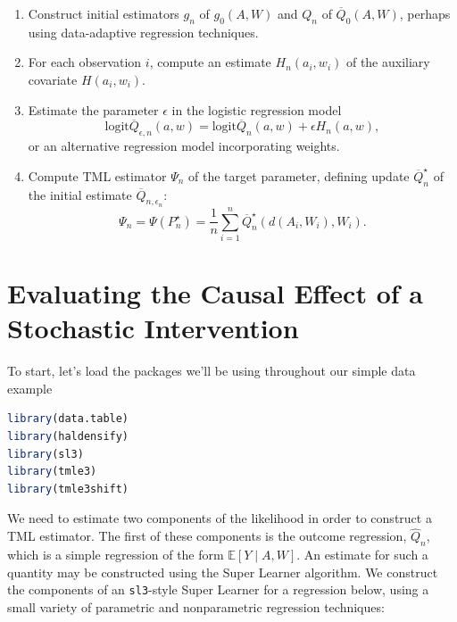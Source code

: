 \documentclass[12pt, krantz2,]{krantz}
\newcommand{\passthrough}[1]{#1}
\providecommand{\tightlist}{%
  \setlength{\itemsep}{0pt}\setlength{\parskip}{0pt}}
\theoremstyle{definition}
\theoremstyle{definition}
\theoremstyle{definition}
\newcommand{\E}{\mathbb{E}}
\newcommand{\1}{\mathbbm{1}}
\begin{document}
\begin{enumerate}
\def\labelenumi{\arabic{enumi}.}
\tightlist
\item
  Construct initial estimators \(g_n\) of \(g_0(A, W)\) and \(Q_n\) of
  \(\overline{Q}_0(A, W)\), perhaps using data-adaptive regression techniques.
\item
  For each observation \(i\), compute an estimate \(H_n(a_i, w_i)\) of the
  auxiliary covariate \(H(a_i,w_i)\).
\item
  Estimate the parameter \(\epsilon\) in the logistic regression model
  \[ \text{logit}\overline{Q}_{\epsilon, n}(a, w) =
  \text{logit}\overline{Q}_n(a, w) + \epsilon H_n(a, w),\]
  or an alternative regression model incorporating weights.
\item
  Compute TML estimator \(\Psi_n\) of the target parameter, defining update
  \(\overline{Q}_n^{\star}\) of the initial estimate
  \(\overline{Q}_{n, \epsilon_n}\):
  \begin{equation}
    \Psi_n = \Psi(P_n^{\star}) = \frac{1}{n} \sum_{i = 1}^n
    \overline{Q}_n^{\star}(d(A_i, W_i), W_i).
    \label{eq:tmle}
  \end{equation}
\end{enumerate}

\hypertarget{evaluating-the-causal-effect-of-a-stochastic-intervention}{%
\section{Evaluating the Causal Effect of a Stochastic Intervention}\label{evaluating-the-causal-effect-of-a-stochastic-intervention}}

To start, let's load the packages we'll be using throughout our simple data example

\begin{lstlisting}[language=R]
library(data.table)
library(haldensify)
library(sl3)
library(tmle3)
library(tmle3shift)
\end{lstlisting}

We need to estimate two components of the likelihood in order to construct a TML
estimator. The first of these components is the outcome regression, \(\hat{Q}_n\),
which is a simple regression of the form \(\E[Y \mid A,W]\). An estimate
for such a quantity may be constructed using the Super Learner algorithm. We
construct the components of an \passthrough{\lstinline!sl3!}-style Super Learner for a regression below,
using a small variety of parametric and nonparametric regression techniques:
\end{document}
